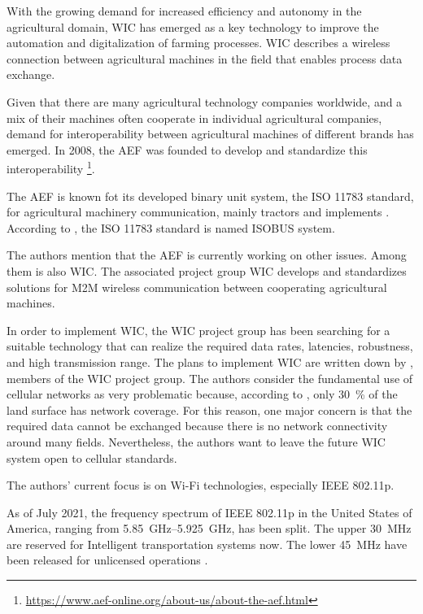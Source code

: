 With the growing demand for increased efficiency and autonomy in the agricultural domain, \ac{WIC} has emerged as a key technology to improve the automation
and digitalization of farming processes. \ac{WIC} describes a wireless connection between agricultural machines
in the field that enables process data exchange.

Given that there are many agricultural technology companies worldwide, and a mix of their machines often cooperate in individual agricultural companies, demand for interoperability between agricultural machines of different brands
has emerged.
In 2008, the \ac{AEF} was founded to develop and standardize this interoperability
\footnote{\url{https://www.aef-online.org/about-us/about-the-aef.html}}.

The AEF is known fot its developed binary unit system, the ISO 11783 standard, for agricultural machinery communication, mainly tractors and
implements \cite{iglesias_enabling_2014}.
According to \textcite{schlingmann_aef_2019}, the ISO 11783 standard is named ISOBUS system.

The authors mention that the AEF is currently working on other issues.
Among them is also \ac{WIC}.
The associated project group \ac{WIC} develops and standardizes solutions for \ac{M2M} wireless
communication between cooperating agricultural machines.

In order to implement \ac{WIC}, the \ac{WIC} project group has been searching for a suitable technology
that can realize the required data rates, latencies, robustness, and high transmission range.
The plans to implement \ac{WIC} are written down by \textcite{schlingmann_challenges_2017}, members of the \ac{WIC} project group.
The authors consider the fundamental use of cellular networks as very problematic
because, according to \cite{itu2016facts}, only \SI{30}{\percent} of the land surface has network coverage.
For this reason, one major concern is that the required data cannot be exchanged because there is
no network connectivity around many fields.
Nevertheless, the authors want to leave the future \ac{WIC} system open
to cellular standards.

The authors' current focus is on Wi-Fi technologies, especially IEEE 802.11p.

As of July 2021, the frequency spectrum of IEEE 802.11p in the United States of
America, ranging from \SIrange{5.85}{5.925}{\giga\hertz}, has been split.
The upper \SI{30}{\mega\hertz}
are reserved for Intelligent transportation systems now.
The lower \SI{45}{\mega\hertz} have
been released for unlicensed operations \cite{fcc_use_2021}.

